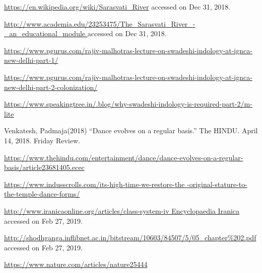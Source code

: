 \begin{thebibliography}{99}
  \url{https://en.wikipedia.org/wiki/Sarasvati_River} accessed on Dec 31, 2018.

  \url{http://www.academia.edu/23253475/The_Sarasvati_River_-_an_educational_module
 } accessed on Dec 31, 2018.

  \url{https://www.pgurus.com/rajiv-malhotras-lecture-on-swadeshi-indology-at-ignca-new-delhi-part-1/
 }

  \url{https://www.pgurus.com/rajiv-malhotras-lecture-on-swadeshi-indology-at-ignca-new-delhi-part-2-colonization/}

  \url{https://www.speakingtree.in/.blog/why-swadeshi-indology-is-required-part-2/m-lite}

  Venkatesh, Padmaja(2018) “Dance evolves on a regular basis.” The HINDU. April 14, 2018. Friday Review.

  \url{https://www.thehindu.com/entertainment/dance/dance-evolves-on-a-regular-basis/article23681405.ecec}

  \url{https://www.indusscrolls.com/its-high-time-we-restore-the -original-stature-to-the-temple-dance-forms/}

  \url{http://www.iranicaonline.org/articles/class-system-iv Encyclopaedia Iranica} accessed on Feb 27, 2019.

  \url{http://shodhganga.inflibnet.ac.in/bitstream/10603/84507/5/05_chapter%202.pdf} accessed on Feb 27, 2019.

  \url{https://www.nature.com/articles/nature25444}

 \end{thebibliography}

\vskip 1cm

\theendnotes

